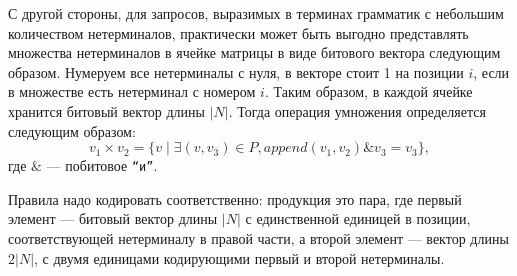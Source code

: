 \begin{algorithm}

\end{algorithm}

С другой стороны, для запросов, выразимых в терминах грамматик с небольшим количеством нетерминалов, практически может быть выгодно представлять множества нетерминалов в ячейке матрицы в виде битового вектора следующим образом.
Нумеруем все нетерминалы с нуля, в векторе стоит 1 на позиции $i$, если в множестве есть нетерминал с номером $i$.
Таким образом, в каждой ячейке хранится битовый вектор длины $|N|$.
Тогда операция умножения определяется следующим образом:
\[v_1 \times v_2 = \{v \mid \exists (v,v_3) \in P, \textit{append}(v_1, v_2) \& v_3 = v_3\},\] где $\&$ --- побитовое \texttt{``и''}.

Правила надо кодировать соответственно: продукция это пара, где первый элемент --- битовый вектор длины $|N|$ с единственной единицей в позиции, соответствующей нетерминалу в правой части, а второй элемент --- вектор длины $2|N|$, с двумя единицами кодирующими первый и второй нетерминалы.

